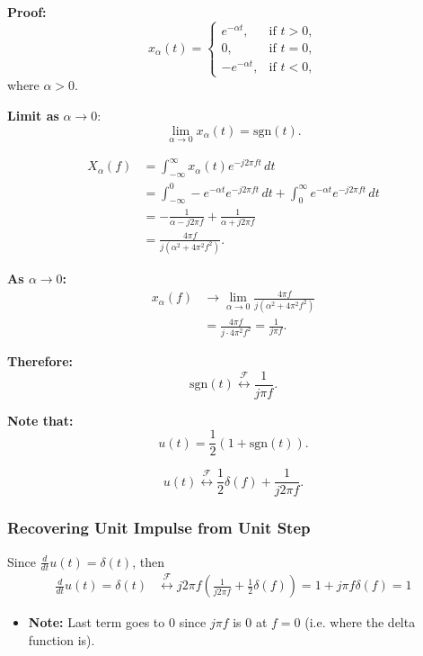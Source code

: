 \begin{derivation}
    \textbf{Proof:}
\[
x_\alpha(t) =
\begin{cases}
    e^{-\alpha t}, & \text{if } t > 0, \\
    0, & \text{if } t = 0, \\
    -e^{-\alpha t}, & \text{if } t < 0,
\end{cases}
\]
where \( \alpha > 0 \).

\bigskip

\textbf{Limit as } \( \alpha \to 0 \):
\[
\lim_{\alpha \to 0} x_\alpha(t) = \text{sgn}(t).
\]



\begin{align*}
    X_\alpha(f) &= \int_{-\infty}^{\infty} x_\alpha(t) e^{-j 2 \pi f t} \, dt \\
    &= \int_{-\infty}^{0} -e^{-\alpha t} e^{-j 2 \pi f t} \, dt + \int_{0}^{\infty} e^{-\alpha t} e^{-j 2 \pi f t} \, dt \\
    &= -\frac{1}{\alpha - j 2 \pi f} + \frac{1}{\alpha + j 2 \pi f} \\
    &= \frac{4 \pi f}{j (\alpha^2 + 4 \pi^2 f^2)}.
\end{align*}

\textbf{As \( \alpha \to 0 \):}
\begin{align*}
    x_\alpha(f) &\to \lim_{\alpha \to 0} \frac{4 \pi f}{j (\alpha^2 + 4 \pi^2 f^2)} \\
    &= \frac{4 \pi f}{j \cdot 4 \pi^2 f^2} = \frac{1}{j \pi f}.
\end{align*}

\textbf{Therefore:}
\[
\text{sgn}(t) \overset{\mathcal{F}}{\leftrightarrow} \frac{1}{j \pi f}.
\]

\bigskip

\textbf{Note that:}
\[
u(t) = \frac{1}{2} \left(1 + \text{sgn}(t)\right).
\]

\[
u(t) \overset{\mathcal{F}}{\leftrightarrow} \frac{1}{2} \delta(f) + \frac{1}{j 2 \pi f}.
\]
\end{derivation}

\subsubsection{Recovering Unit Impulse from Unit Step}
\begin{derivation}
    Since $\frac{d}{dt} u(t) = \delta(t)$, then
    \begin{align*}
        \frac{d}{dt} u(t) = \delta(t) &\overset{\mathcal{F}}{\leftrightarrow} j2\pi f \left( \frac{1}{j2\pi f} + \frac{1}{2} \delta(f) \right) = 1 + j\pi f \delta(f) = 1
    \end{align*}        
    \begin{itemize}
        \item \textbf{Note:} Last term goes to $0$ since $j\pi f$ is $0$ at $f=0$ (i.e. where the delta function is).
    \end{itemize}
\end{derivation}

